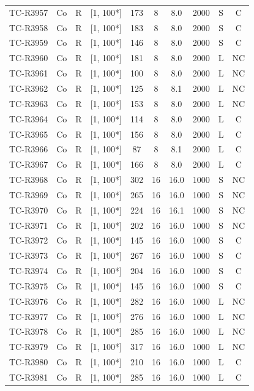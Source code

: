 \begin{longtable}{lccccccccc}
TC-R3957 & Co & R & [1, 100*] & 173 & 8 & 8.0 & 2000 & S & C \\
TC-R3958 & Co & R & [1, 100*] & 183 & 8 & 8.0 & 2000 & S & C \\
TC-R3959 & Co & R & [1, 100*] & 146 & 8 & 8.0 & 2000 & S & C \\
TC-R3960 & Co & R & [1, 100*] & 181 & 8 & 8.0 & 2000 & L & NC \\
TC-R3961 & Co & R & [1, 100*] & 100 & 8 & 8.0 & 2000 & L & NC \\
TC-R3962 & Co & R & [1, 100*] & 125 & 8 & 8.1 & 2000 & L & NC \\
TC-R3963 & Co & R & [1, 100*] & 153 & 8 & 8.0 & 2000 & L & NC \\
TC-R3964 & Co & R & [1, 100*] & 114 & 8 & 8.0 & 2000 & L & C \\
TC-R3965 & Co & R & [1, 100*] & 156 & 8 & 8.0 & 2000 & L & C \\
TC-R3966 & Co & R & [1, 100*] & 87 & 8 & 8.1 & 2000 & L & C \\
TC-R3967 & Co & R & [1, 100*] & 166 & 8 & 8.0 & 2000 & L & C \\
TC-R3968 & Co & R & [1, 100*] & 302 & 16 & 16.0 & 1000 & S & NC \\
TC-R3969 & Co & R & [1, 100*] & 265 & 16 & 16.0 & 1000 & S & NC \\
TC-R3970 & Co & R & [1, 100*] & 224 & 16 & 16.1 & 1000 & S & NC \\
TC-R3971 & Co & R & [1, 100*] & 202 & 16 & 16.0 & 1000 & S & NC \\
TC-R3972 & Co & R & [1, 100*] & 145 & 16 & 16.0 & 1000 & S & C \\
TC-R3973 & Co & R & [1, 100*] & 267 & 16 & 16.0 & 1000 & S & C \\
TC-R3974 & Co & R & [1, 100*] & 204 & 16 & 16.0 & 1000 & S & C \\
TC-R3975 & Co & R & [1, 100*] & 145 & 16 & 16.0 & 1000 & S & C \\
TC-R3976 & Co & R & [1, 100*] & 282 & 16 & 16.0 & 1000 & L & NC \\
TC-R3977 & Co & R & [1, 100*] & 276 & 16 & 16.0 & 1000 & L & NC \\
TC-R3978 & Co & R & [1, 100*] & 285 & 16 & 16.0 & 1000 & L & NC \\
TC-R3979 & Co & R & [1, 100*] & 317 & 16 & 16.0 & 1000 & L & NC \\
TC-R3980 & Co & R & [1, 100*] & 210 & 16 & 16.0 & 1000 & L & C \\
TC-R3981 & Co & R & [1, 100*] & 285 & 16 & 16.0 & 1000 & L & C \\

\end{longtable}
